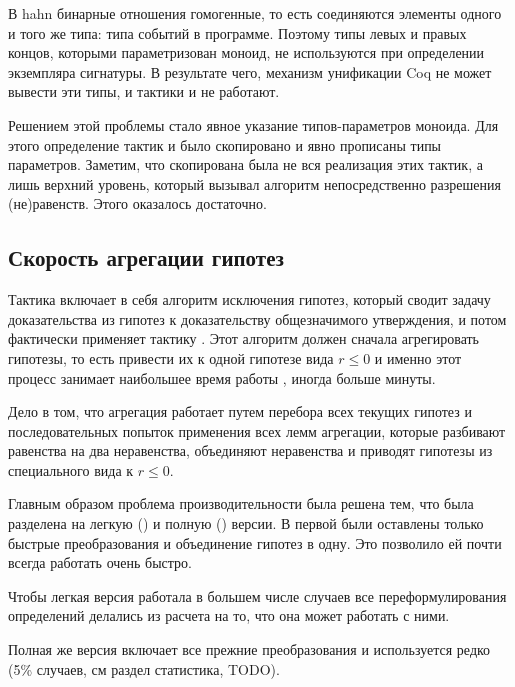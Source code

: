 \documentclass[times
              ]{itmo-student-thesis}
\begin{document}
      В hahn бинарные отношения гомогенные, то есть соединяются элементы одного и того же
      типа: типа событий в программе. Поэтому типы левых и правых концов, которыми
      параметризован моноид, не
      используются при определении экземпляра сигнатуры. В результате чего, механизм унификации Coq не
      может вывести эти типы, и тактики  и  не работают.

      Решением этой проблемы стало явное указание типов-параметров моноида. Для этого определение
      тактик  и  было скопировано и явно прописаны типы параметров. Заметим, что
      скопирована была не вся реализация этих тактик, а лишь верхний уровень, который вызывал
      алгоритм непосредственно разрешения (не)равенств. Этого оказалось достаточно.

    \subsection{Скорость агрегации гипотез}

      Тактика  включает в себя алгоритм исключения гипотез\cite{hkat,hkat_cpc}, который
      сводит задачу доказательства из гипотез к доказательству общезначимого утверждения,
      и потом фактически применяет тактику . Этот алгоритм должен сначала агрегировать
      гипотезы, то есть привести их к одной гипотезе вида
      $r \leq 0$ и именно этот процесс занимает наибольшее время работы , иногда больше минуты.

      Дело в том, что агрегация работает путем перебора всех текущих гипотез и последовательных попыток
      применения всех лемм агрегации, которые разбивают равенства на два неравенства, объединяют
      неравенства и приводят гипотезы из специального вида к $r \leq 0$.

      Главным образом проблема производительности была решена тем, что  была разделена на
      легкую () и полную () версии.
      В первой были оставлены только быстрые преобразования и объединение гипотез в одну.
      Это позволило ей почти всегда работать очень быстро.

      Чтобы легкая версия работала в большем числе случаев все переформулирования определений
      делались из расчета на то, что она может работать с ними.

      Полная же версия включает все прежние преобразования и используется редко (5\% случаев, см раздел
      статистика, TODO).
\end{document}
